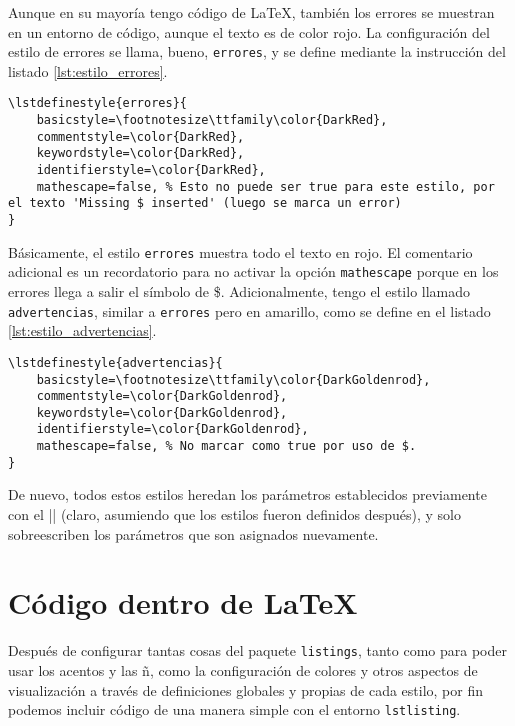 Aunque en su mayoría tengo código de \LaTeX{}, también los errores se muestran en un entorno de código, aunque el texto es de color rojo. La configuración del estilo de errores se llama, bueno, \texttt{errores}, y se define mediante la instrucción del listado \ref{lst:estilo_errores}.

\begin{lstlisting}[style=latex,mathescape=false,label=lst:estilo_errores,caption={Estilo para mostrar errores de compilación de \LaTeX{}.}]
\lstdefinestyle{errores}{
    basicstyle=\footnotesize\ttfamily\color{DarkRed},
    commentstyle=\color{DarkRed},
    keywordstyle=\color{DarkRed},
    identifierstyle=\color{DarkRed},
    mathescape=false, % Esto no puede ser true para este estilo, por el texto 'Missing $ inserted' (luego se marca un error)
}
\end{lstlisting}

Básicamente, el estilo \texttt{errores} muestra todo el texto en rojo. El comentario adicional es un recordatorio para no activar la opción \texttt{mathescape} porque en los errores llega a salir el símbolo de \$. Adicionalmente, tengo el estilo llamado \texttt{advertencias}, similar a \texttt{errores} pero en amarillo, como se define en el listado \ref{lst:estilo_advertencias}.

\begin{lstlisting}[style=latex,mathescape=false,label=lst:estilo_advertencias,caption={Estilo para mostrar advertencias de compilación de \LaTeX{}.}]
\lstdefinestyle{advertencias}{
    basicstyle=\footnotesize\ttfamily\color{DarkGoldenrod},
    commentstyle=\color{DarkGoldenrod},
    keywordstyle=\color{DarkGoldenrod},
    identifierstyle=\color{DarkGoldenrod},
    mathescape=false, % No marcar como true por uso de $.
}
\end{lstlisting}

De nuevo, todos estos estilos heredan los parámetros establecidos previamente con el |\lstset| (claro, asumiendo que los estilos fueron definidos después), y solo sobreescriben los parámetros que son asignados nuevamente.



\section{Código dentro de \LaTeX{}}
\label{sec:codigo_dentro_de_latex}



Después de configurar tantas cosas del paquete \texttt{listings}, tanto como para poder usar los acentos y las ñ, como la configuración de colores y otros aspectos de visualización a través de definiciones globales y propias de cada estilo, por fin podemos incluir código de una manera simple con el entorno \texttt{lstlisting}.

